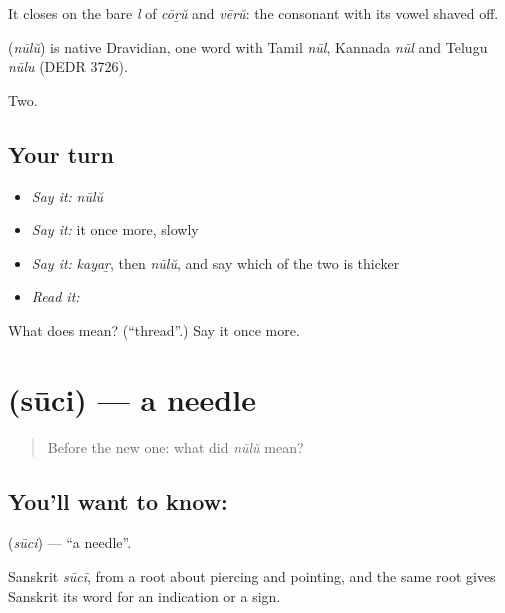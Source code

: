It closes on the bare \emph{l} of \emph{cōṟŭ} and \emph{vērŭ}: the consonant with its vowel shaved off.

\begin{cousinweb}
\textbf{} (\emph{nūlŭ}) is native Dravidian, one word with Tamil \emph{nūl}, Kannada \emph{nūl} and Telugu \emph{nūlu} (DEDR 3726).
\end{cousinweb}

\begin{grammarlens}[title={What you've built}]
Two.
\end{grammarlens}

\subsection*{Your turn}
\begin{itemize}
\raggedright
  \item \emph{Say it:} \emph{nūlŭ}
  \item \emph{Say it:} it once more, slowly
  \item \emph{Say it:} \emph{kayaṟ}, then \emph{nūlŭ}, and say which of the two is thicker
  \item \emph{Read it:} \textbf{}
\end{itemize}

\begin{tcolorbox}[breakable,colback=teal!4,colframe=teal!35!black,title={Before you move on}]
What does  mean? (\textquotedblleft{}thread\textquotedblright{}.) Say it once more.
\end{tcolorbox}
\section[\texorpdfstring{\ml{സൂചി} (sūci)}{സൂചി (sūci)}]{ (sūci) — a needle}

\label{lesson:ML-C62-needle}



\begin{quote}
Before the new one: what did \emph{nūlŭ} mean?
\end{quote}

\subsection*{You'll want to know: }
\textbf{} (\emph{sūci}) — \textquotedblleft{}a needle\textquotedblright{}.

Sanskrit \emph{sūcī}, from a root about piercing and pointing, and the same root gives Sanskrit its word for an indication or a sign.

